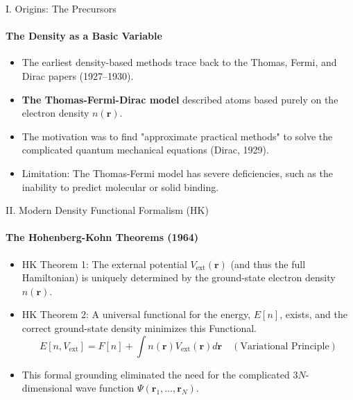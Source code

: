 
\begin{frame}{\large I. Origins: The Precursors}
    \framesubtitle{The Density as a Basic Variable}
    \begin{itemize}
        \item The earliest density-based methods trace back to the Thomas, Fermi, and Dirac papers (1927–1930).
        \item \textbf{The Thomas-Fermi-Dirac model} described atoms based purely on the electron density $n(\mathbf{r})$.
        \item The motivation was to find "approximate practical methods" to solve the complicated quantum mechanical equations (Dirac, 1929).
        \item Limitation: The Thomas-Fermi model has severe deficiencies, such as the inability to predict molecular or solid binding.
    \end{itemize}
\end{frame}

\begin{frame}{\large II. Modern Density Functional Formalism (HK)}
    \framesubtitle{The Hohenberg-Kohn Theorems (1964)}
    \begin{itemize}
        \item HK Theorem 1: The external potential $V_{\text{ext}}(\mathbf{r})$ (and thus the full Hamiltonian) is uniquely determined by the ground-state electron density $n(\mathbf{r})$.
        \item HK Theorem 2: A universal functional for the energy, $E[n]$, exists, and the correct ground-state density minimizes this Functional.
        \begin{equation*}
            E[n, V_{\text{ext}}] = F[n] + \int n(\mathbf{r}) V_{\text{ext}}(\mathbf{r}) d\mathbf{r} \quad (\text{Variational Principle})
        \end{equation*}
        \item This formal grounding eliminated the need for the complicated $3N$-dimensional wave function $\Psi(\mathbf{r}_1, \ldots, \mathbf{r}_N)$.
    \end{itemize}
\end{frame}

